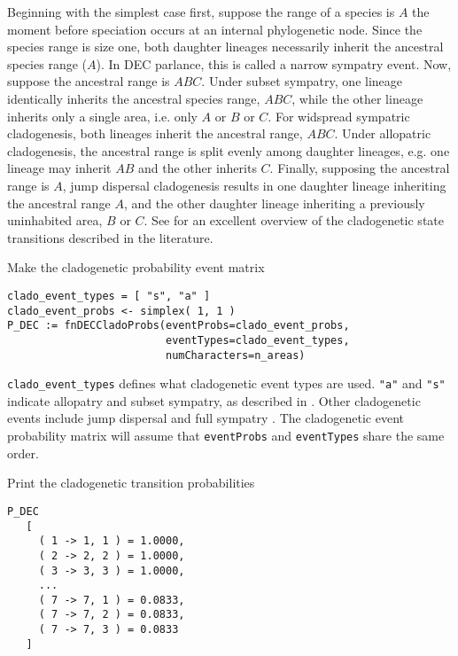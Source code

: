 Beginning with the simplest case first, suppose the range of a species is $A$ the moment before speciation occurs at an internal phylogenetic node.
Since the species range is size one, both daughter lineages necessarily inherit the ancestral species range ($A$).
In DEC parlance, this is called a narrow sympatry event.
Now, suppose the ancestral range is $ABC$.
Under subset sympatry, one lineage identically inherits the ancestral species range, $ABC$, while the other lineage inherits only a single area, i.e. only $A$ or $B$ or $C$.
For widspread sympatric cladogenesis, both lineages inherit the ancestral range, $ABC$.
Under allopatric cladogenesis, the ancestral range is split evenly among daughter lineages, e.g. one lineage may inherit $AB$ and the other inherits $C$.
Finally, supposing the ancestral range is $A$, jump dispersal cladogenesis results in one daughter lineage inheriting the ancestral range $A$, and the other daughter lineage inheriting a previously uninhabited area, $B$ or $C$.
See \citet{Matzke2012} for an excellent overview of the cladogenetic state transitions described in the literature.

Make the cladogenetic probability event matrix

\begin{snugshade}
\begin{lstlisting}
clado_event_types = [ "s", "a" ]
clado_event_probs <- simplex( 1, 1 )
P_DEC := fnDECCladoProbs(eventProbs=clado_event_probs,
                         eventTypes=clado_event_types,
                         numCharacters=n_areas)
\end{lstlisting}
\end{snugshade}

{\tt clado\_event\_types} defines what cladogenetic event types are used.
{\tt "a"} and {\tt "s"} indicate allopatry and subset sympatry, as described in \citep{Ree2005}.
Other cladogenetic events include jump dispersal \citep[{\tt "j"};][]{Matzke2012} and full sympatry \citep[{\tt "f"};][]{Landis2013a}.
The cladogenetic event probability matrix will assume that {\tt eventProbs} and {\tt eventTypes} share the same order.

Print the cladogenetic transition probabilities

\begin{snugshade}
\begin{lstlisting}
P_DEC
   [
     ( 1 -> 1, 1 ) = 1.0000,
     ( 2 -> 2, 2 ) = 1.0000,
     ( 3 -> 3, 3 ) = 1.0000,
     ...
     ( 7 -> 7, 1 ) = 0.0833,
     ( 7 -> 7, 2 ) = 0.0833,
     ( 7 -> 7, 3 ) = 0.0833
   ]
\end{lstlisting}
\end{snugshade}

